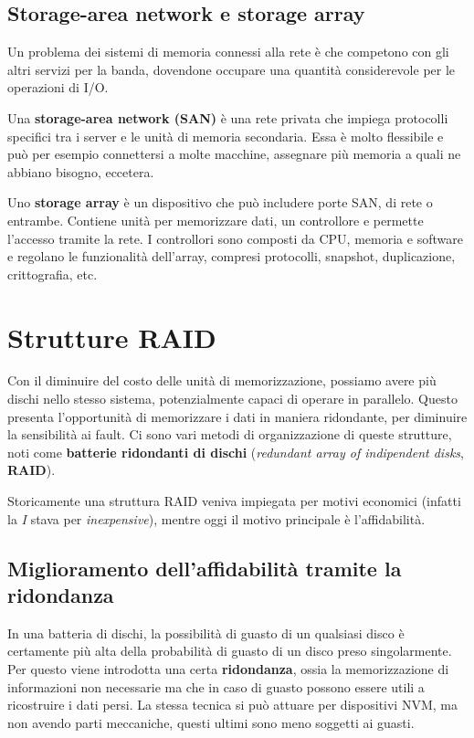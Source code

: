     \subsection{Storage-area network e storage array}
        Un problema dei sistemi di memoria connessi alla rete è che competono con gli altri servizi per la banda, dovendone occupare una quantità considerevole per le operazioni di I/O.
        
        Una \textbf{storage-area network (SAN)} è una rete privata che impiega protocolli specifici tra i server e le unità di memoria secondaria. Essa è molto flessibile e può per esempio connettersi a molte macchine, assegnare più memoria a quali ne abbiano bisogno, eccetera.
        
        Uno \textbf{storage array} è un dispositivo che può includere porte SAN, di rete o entrambe. Contiene unità per memorizzare dati, un controllore e permette l'accesso tramite la rete. I controllori sono composti da CPU, memoria e software e regolano le funzionalità dell'array, compresi protocolli, snapshot, duplicazione, crittografia, etc.
        
\section{Strutture RAID}
    Con il diminuire del costo delle unità di memorizzazione, possiamo avere più dischi nello stesso sistema, potenzialmente capaci di operare in parallelo. Questo presenta l'opportunità di memorizzare i dati in maniera ridondante, per diminuire la sensibilità ai fault. Ci sono vari metodi di organizzazione di queste strutture, noti come \textbf{batterie ridondanti di dischi} (\textit{redundant array of indipendent disks}, \textbf{RAID}).
    
    Storicamente una struttura RAID veniva impiegata per motivi economici (infatti la \textit{I} stava per \textit{inexpensive}), mentre oggi il motivo principale è l'affidabilità.
    
    \subsection{Miglioramento dell'affidabilità tramite la ridondanza}
        In una batteria di dischi, la possibilità di guasto di un qualsiasi disco è certamente più alta della probabilità di guasto di un disco preso singolarmente. Per questo viene introdotta una certa \textbf{ridondanza}, ossia la memorizzazione di informazioni non necessarie ma che in caso di guasto possono essere utili a ricostruire i dati persi. La stessa tecnica si può attuare per dispositivi NVM, ma non avendo parti meccaniche, questi ultimi sono meno soggetti ai guasti.
        
